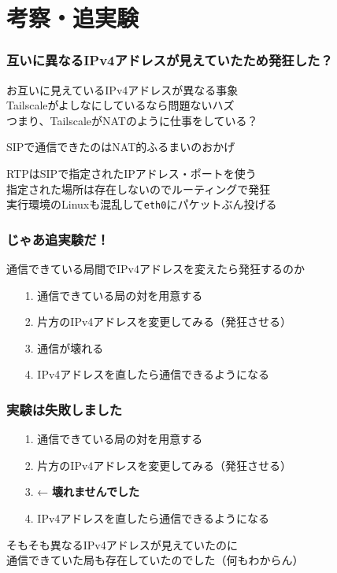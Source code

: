 \documentclass[
  lualatex,
  aspectratio=169,
  14pt
]{beamer}
\begin{document}
\section{考察・追実験}
\note{ }

\begin{frame}
  \frametitle{互いに異なるIPv4アドレスが見えていたため発狂した？}

  お互いに見えているIPv4アドレスが異なる事象\\
  \hspace{1.5\zw}Tailscaleがよしなにしているなら問題ないハズ\\
  \hspace{1.5\zw}つまり、TailscaleがNATのように仕事をしている？

  SIPで通信できたのはNAT的ふるまいのおかげ

  RTPはSIPで指定されたIPアドレス・ポートを使う\\
  \hspace{1.5\zw}指定された場所は存在しないのでルーティングで発狂\\
  \hspace{1.5\zw}実行環境のLinuxも混乱して\texttt{eth0}にパケットぶん投げる

  \note{ }
\end{frame}

\begin{frame}
  \frametitle{じゃあ追実験だ！}

  通信できている局間でIPv4アドレスを変えたら発狂するのか

  \begin{itemize}
    \item[1.]
      通信できている局の対を用意する
    \item[2.]
      片方のIPv4アドレスを変更してみる（発狂させる）
    \item[3.]
      通信が壊れる
    \item[4.]
      IPv4アドレスを直したら通信できるようになる
  \end{itemize}

  \note{ }
\end{frame}

\begin{frame}
  \frametitle{実験は失敗しました}

  \begin{itemize}
    \item[1.]
      通信できている局の対を用意する
    \item[2.]
      片方のIPv4アドレスを変更してみる（発狂させる）
    \item[3.]
       ← \textbf{壊れませんでした}
    \item[4.]
      IPv4アドレスを直したら通信できるようになる
  \end{itemize}

  そもそも異なるIPv4アドレスが見えていたのに\\
  \hspace{1.5\zw}通信できていた局も存在していたのでした（何もわからん）

  \note{ }
\end{frame}
\end{document}
